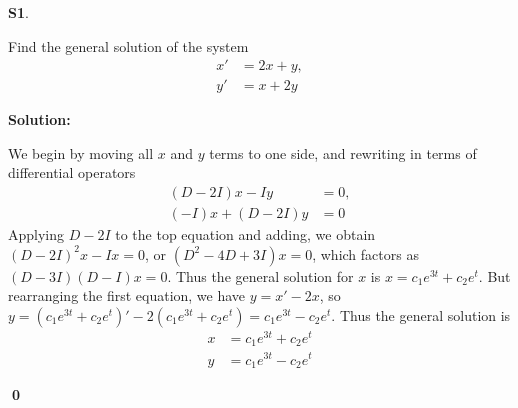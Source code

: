 \documentclass{article}
\newenvironment{problem}[1]
{
  \begin{flushleft}
  \textbf{#1}.
  \ignorespaces
}
{
  \end{flushleft}
}
\newenvironment{solution}
{
  \ignorespaces
  \textbf{Solution:}
}
{
  \ignorespacesafterend
  \begin{flushright}
  {\bfseries \qed}
  \end{flushright}
}
\begin{document}
\begin{problem}{S1}
Find the general solution of the system
\begin{align*}
x' & = 2x + y,\\
y' & = x + 2y
\end{align*}
\end{problem}
\begin{solution}

We begin by moving all \(x\) and \(y\) terms to one side, and rewriting in terms of differential operators
\begin{align*}
(D-2I)x-Iy & =0 ,\\
(-I)x+(D-2I)y & = 0
\end{align*}
Applying \(D-2I\) to the top equation and adding, we obtain \( (D-2I)^2x-Ix=0\), or \((D^2-4D+3I)x=0\), which factors as \((D-3I)(D-I)x=0\).  Thus the general solution for \(x\) is \(x=c_1 e^{3t}+c_2e^t\).  But rearranging the first equation, we have \(y=x'-2x\), so \(y=\left(c_1 e^{3t}+c_2e^t\right)'-2\left(c_1 e^{3t}+c_2e^t\right) = c_1e^{3t}-c_2e^t\).  Thus the general solution is
\begin{align*}
x&=c_1e^{3t}+c_2e^t \\
y&=c_1e^{3t}-c_2e^t
\end{align*}

\end{solution}
\end{document}
